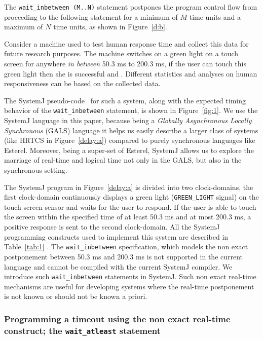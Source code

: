 The \texttt{wait\_inbetween (M..N)} statement postpones the program
control flow from proceeding to the following statement for a minimum of
$M$ time units and a maximum of $N$ time units, as shown in
Figure~\ref{d:b}.

Consider a machine used to test human response time and collect this
data for future research purposes. The machine switches on a green light
on a touch screen for anywhere \textit{in between} 50.3 ms to 200.3 ms,
if the user can touch this green light then she is successful and . Different statistics and analyses on human
responsiveness can be based on the collected data.

The SystemJ pseudo-code~\cite{amal10} for such a system, along with the
expected timing behavior of the \texttt{wait\_inbetween} statement, is
shown in Figure~\ref{fig:1}. We use the SystemJ language in this paper,
because being a \textit{Globally Asynchronous Locally Synchronous}
(GALS) language it helps us easily describe a larger class of systems
(like HRTCS in Figure~\ref{delay:a}) compared to purely synchronous
languages like Esterel. Moreover, being a super-set of Esterel, SystemJ
allows us to explore the marriage of real-time and logical time not only
in the GALS, but also in the synchronous setting.

The SystemJ program in Figure~\ref{delay:a} is divided into two
 clock-domains, the first clock-domain
continuously displays a green light (\texttt{GREEN\_LIGHT} signal) on
the touch screen sensor and waits for the user to respond. If the user
is able to touch the screen within the specified time of at least 50.3
ms and at most 200.3 ms, a positive response is sent to the second
clock-domain. All the SystemJ programming constructs used to implement
this system are described in Table~\ref{tab:1} . The \texttt{wait\_inbetween}
specification, which models the non exact postponement between 50.3 ms
and 200.3 ms is not supported in the current language and cannot be
compiled with the current SystemJ compiler. We introduce such
\texttt{wait\_inbetween} statements in SystemJ. Such non exact real-time
mechanisms are useful for developing systems where the real-time
postponement is not known or should not be known a priori.

\subsubsection{Programming a timeout using the non exact real-time
  construct; the \texttt{wait\_atleast} statement}
\label{sec:progr-time-using}

